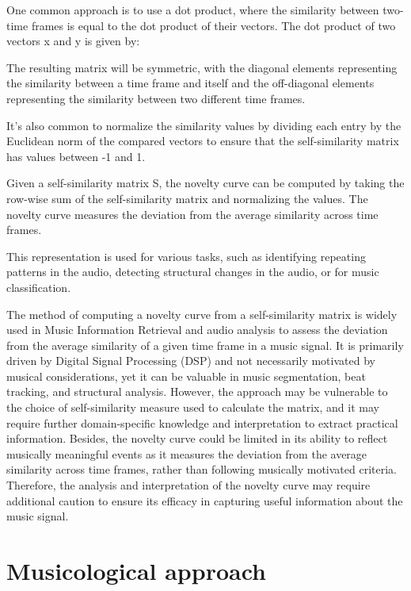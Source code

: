 One common approach is to use a dot product, where the similarity between two-time frames is equal to the dot product of their vectors. The dot product of two vectors x and y is given by:



The resulting matrix will be symmetric, with the diagonal elements representing the similarity between a time frame and itself and the off-diagonal elements representing the similarity between two different time frames.

It's also common to normalize the similarity values by dividing each entry by the Euclidean norm of the compared vectors to ensure that the self-similarity matrix has values between -1 and 1.

Given a self-similarity matrix S, the novelty curve can be computed by taking the row-wise sum of the self-similarity matrix and normalizing the values. The novelty curve measures the deviation from the average similarity across time frames.



This representation is used for various tasks, such as identifying repeating patterns in the audio, detecting structural changes in the audio, or for music classification.

The method of computing a novelty curve from a self-similarity matrix is widely used in Music Information Retrieval and audio analysis to assess the deviation from the average similarity of a given time frame in a music signal. It is primarily driven by Digital Signal Processing (DSP) and not necessarily motivated by musical considerations, yet it can be valuable in music segmentation, beat tracking, and structural analysis. However, the approach may be vulnerable to the choice of self-similarity measure used to calculate the matrix, and it may require further domain-specific knowledge and interpretation to extract practical information. Besides, the novelty curve could be limited in its ability to reflect musically meaningful events as it measures the deviation from the average similarity across time frames, rather than following musically motivated criteria. Therefore, the analysis and interpretation of the novelty curve may require additional caution to ensure its efficacy in capturing useful information about the music signal.

\section{Musicological approach}
